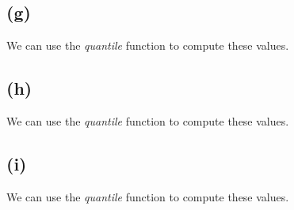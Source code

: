 \begin{appendices}

        \subsection*{(g)}

            We can use the \textit{quantile} function to compute these values.


        \subsection*{(h)}

            We can use the \textit{quantile} function to compute these values.


        \subsection*{(i)}

            We can use the \textit{quantile} function to compute these values.

\end{appendices}
